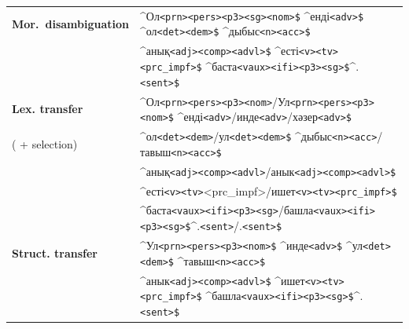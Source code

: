 \documentclass[11pt]{article}
\newcommand{\tag}[1]{{\small{\texttt{#1}}}}
\begin{document}
\begin{table}[htbp]
\begin{tabular}{ll}
\midrule
{\bf Mor.\ disambiguation} & \^{}Ол\tag{<prn>}\tag{<pers>}\tag{<p3>}\tag{<sg>}\tag{<nom>}\tag{\$} \^{}енді\tag{<adv>}\tag{\$} \^{}ол\tag{<det>}\tag{<dem>}\tag{\$} \^{}дыбыс\tag{<n>}\tag{<acc>}\tag{\$} \\
                     & \^{}анық\tag{<adj>}\tag{<comp>}\tag{<advl>}\tag{\$} \^{}есті\tag{<v>}\tag{<tv>}\tag{<prc\_impf>}\tag{\$} \^{}баста\tag{<vaux>}\tag{<ifi>}\tag{<p3>}\tag{<sg>}\tag{\$}\^{}.\tag{<sent>}\tag{\$} \\
\midrule
{\bf Lex. transfer} & \^{}Ол\tag{<prn>}\tag{<pers>}\tag{<p3>}\tag{<nom>}/Ул\tag{<prn>}\tag{<pers>}\tag{<p3>}\tag{<nom>}\tag{\$} \^{}енді\tag{<adv>}/инде\tag{<adv>}/хәзер\tag{<adv>}\tag{\$} \\
 ( + selection)     & \^{}ол\tag{<det>}\tag{<dem>}/ул\tag{<det>}\tag{<dem>}\tag{\$} \^{}дыбыс\tag{<n>}\tag{<acc>}/тавыш\tag{<n>}\tag{<acc>}\tag{\$} \\
                    & \^{}анық\tag{<adj>}\tag{<comp>}\tag{<advl>}/анык\tag{<adj>}\tag{<comp>}\tag{<advl>}\tag{\$}  \\
						  & \^{}есті\tag{<v>}\tag{<tv>}<prc\_impf>/ишет\tag{<v>}\tag{<tv>}\tag{<prc\_impf>}\tag{\$} \\
                    & \^{}баста\tag{<vaux>}\tag{<ifi>}\tag{<p3>}\tag{<sg>}/башла\tag{<vaux>}\tag{<ifi>}\tag{<p3>}\tag{<sg>}\tag{\$}\^{}.\tag{<sent>}/.\tag{<sent>}\tag{\$} \\
\midrule
{\bf Struct. transfer}& \^{}Ул\tag{<prn>}\tag{<pers>}\tag{<p3>}\tag{<nom>}\tag{\$} \^{}инде\tag{<adv>}\tag{\$} \^{}ул\tag{<det>}\tag{<dem>}\tag{\$} \^{}тавыш\tag{<n>}\tag{<acc>}\tag{\$} \\
                      & \^{}анык\tag{<adj>}\tag{<comp>}\tag{<advl>}\tag{\$} \^{}ишет\tag{<v>}\tag{<tv>}\tag{<prc\_impf>}\tag{\$} \^{}башла\tag{<vaux>}\tag{<ifi>}\tag{<p3>}\tag{<sg>}\tag{\$}\^{}.\tag{<sent>}\tag{\$} \\


\end{tabular}
\end{table}
\end{document}

